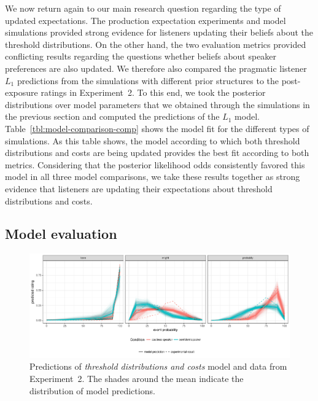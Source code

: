 \documentclass[lucida,biblatex]{sp} %
\newcommand{\tableref}[1]{Table~\ref{#1}}
\begin{document}
We now return again to our main research question regarding the type of updated expectations. The production expectation experiments and model simulations provided strong evidence for listeners updating 
their beliefs about the threshold distributions. On the other hand, the two evaluation metrics provided conflicting results regarding the questions whether beliefs about speaker preferences are also updated.
We therefore also compared the pragmatic listener $L_1$ predictions from the simulations with different prior structures to the post-exposure ratings in Experiment~2. To this end, we took the
posterior distributions over model parameters that we obtained through the simulations in the previous section and computed the predictions of the $L_1$ model. \tableref{tbl:model-comparison-comp} shows the model fit
for the different types of simulations. As this table shows, the model according to which both threshold distributions and costs are being updated provides the best fit according to both metrics. 
Considering that the posterior likelihood odds consistently favored this model in all three model comparisons, we take these results together as strong evidence that listeners are updating their expectations about threshold distributions
and costs. 

\subsection{Model evaluation}
\begin{figure}
\includegraphics[width=\textwidth]{plots/adaptation-posterior-comp-data.pdf}
\caption{Predictions of \textit{threshold distributions and costs} model and data from Experiment~2. The shades around the mean indicate the distribution of model predictions.  \label{fig:post-exposure-comp-data}}
\end{figure}
\end{document}
